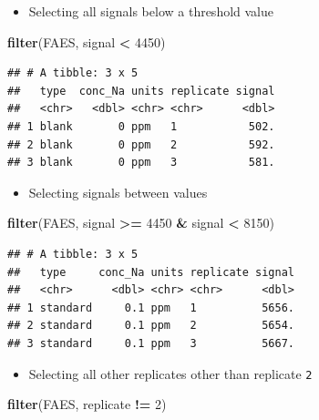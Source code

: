 \documentclass[
]{book}
\newenvironment{Shaded}{\begin{snugshade}}{\end{snugshade}}
\newcommand{\DecValTok}[1]{\textcolor[rgb]{0.00,0.00,0.81}{#1}}
\newcommand{\FunctionTok}[1]{\textcolor[rgb]{0.13,0.29,0.53}{\textbf{#1}}}
\newcommand{\NormalTok}[1]{#1}
\newcommand{\SpecialCharTok}[1]{\textcolor[rgb]{0.81,0.36,0.00}{\textbf{#1}}}
\providecommand{\tightlist}{%
  \setlength{\itemsep}{0pt}\setlength{\parskip}{0pt}}
\begin{document}
\begin{itemize}
\tightlist
\item
  Selecting all signals below a threshold value
\end{itemize}

\begin{Shaded}
\begin{Highlighting}[]
\FunctionTok{filter}\NormalTok{(FAES, signal }\SpecialCharTok{\textless{}} \DecValTok{4450}\NormalTok{)}
\end{Highlighting}
\end{Shaded}

\begin{verbatim}
## # A tibble: 3 x 5
##   type  conc_Na units replicate signal
##   <chr>   <dbl> <chr> <chr>      <dbl>
## 1 blank       0 ppm   1           502.
## 2 blank       0 ppm   2           592.
## 3 blank       0 ppm   3           581.
\end{verbatim}

\begin{itemize}
\tightlist
\item
  Selecting signals between values
\end{itemize}

\begin{Shaded}
\begin{Highlighting}[]
\FunctionTok{filter}\NormalTok{(FAES, signal }\SpecialCharTok{\textgreater{}=} \DecValTok{4450} \SpecialCharTok{\&}\NormalTok{ signal }\SpecialCharTok{\textless{}} \DecValTok{8150}\NormalTok{)}
\end{Highlighting}
\end{Shaded}

\begin{verbatim}
## # A tibble: 3 x 5
##   type     conc_Na units replicate signal
##   <chr>      <dbl> <chr> <chr>      <dbl>
## 1 standard     0.1 ppm   1          5656.
## 2 standard     0.1 ppm   2          5654.
## 3 standard     0.1 ppm   3          5667.
\end{verbatim}

\begin{itemize}
\tightlist
\item
  Selecting all other replicates other than replicate \texttt{2}
\end{itemize}

\begin{Shaded}
\begin{Highlighting}[]
\FunctionTok{filter}\NormalTok{(FAES, replicate }\SpecialCharTok{!=} \DecValTok{2}\NormalTok{)}
\end{Highlighting}
\end{Shaded}
\end{document}
